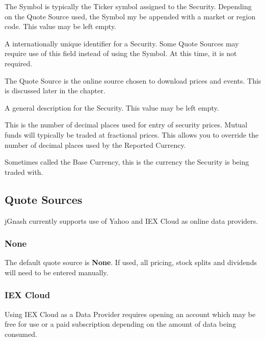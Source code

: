 \documentclass[letterpaper,12pt]{book}
\begin{document}
    \begin{description}[style=nextline]
        \item[Symbol \textit{(required)}]
        The Symbol is typically the Ticker symbol assigned to the Security.  Depending on the Quote Source used,
        the Symbol my be appended with a market or region code. This value may be left empty.
        \item[CUSIP / ISIN]
        A internationally unique identifier for a Security.  Some Quote Sources may require use of this field
        instead of using the Symbol.  At this time, it is not required. 
        \item[Quote Source \textit{(required)}]
        The Quote Source is the online source chosen to download prices and events.  This is discussed later 
        in the chapter.
        \item[Description]
        A general description for the Security.  This value may be left empty.
        \item[Scale \textit{(required)}]
        This is the number of decimal places used for entry of security prices.  Mutual funds will typically
        be traded at fractional prices.  This allows you to override the number of decimal places used by the
        Reported Currency.
        \item[Reported Currency \textit{(required)}]
        Sometimes called the Base Currency, this is the currency the Security is being traded with.        
    \end{description}        
    
    \subsection{Quote Sources}
       
    jGnash currently supports use of Yahoo and IEX Cloud as online data providers.
    
    \subsubsection{None}
    The default quote source is \textbf{None}.  If used, all pricing, stock splits and dividends will
    need to be entered manually.
    
    \subsubsection{IEX Cloud}
    Using IEX Cloud as a Data Provider requires opening an account which may be free for use or a paid
    subscription depending on the amount of data being consumed. 
    
\end{document}

